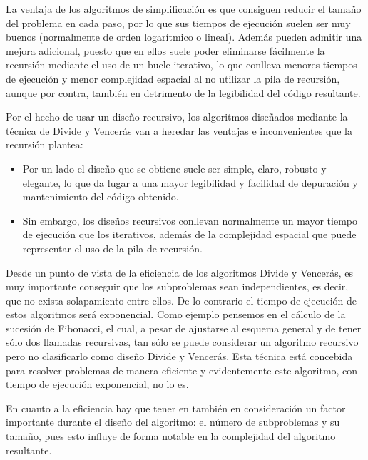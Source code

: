La ventaja de los algoritmos de simplificación es que consiguen reducir el
tamaño del problema en cada paso, por lo que sus tiempos de ejecución suelen ser
muy buenos (normalmente de orden logarítmico o lineal). Además pueden admitir
una mejora adicional, puesto que en ellos suele poder eliminarse fácilmente la
recursión mediante el uso de un bucle iterativo, lo que conlleva menores tiempos
de ejecución y menor complejidad espacial al no utilizar la pila de recursión,
aunque por contra, también en detrimento de la legibilidad del código resultante.

Por el hecho de usar un diseño recursivo, los algoritmos diseñados mediante la
técnica de Divide y Vencerás van a heredar las ventajas e inconvenientes que la
recursión plantea:

\begin{itemize}
	\item Por un lado el diseño que se obtiene suele ser simple, claro, robusto y elegante,
	lo que da lugar a una mayor legibilidad y facilidad de depuración y
	mantenimiento del código obtenido.
	
	\item Sin embargo, los diseños recursivos conllevan normalmente un mayor tiempo
	de ejecución que los iterativos, además de la complejidad espacial que puede
	representar el uso de la pila de recursión.
\end{itemize}

Desde un punto de vista de la eficiencia de los algoritmos Divide y Vencerás, es
muy importante conseguir que los subproblemas sean independientes, es decir, que
no exista solapamiento entre ellos. De lo contrario el tiempo de ejecución de estos
algoritmos será exponencial. Como ejemplo pensemos en el cálculo de la sucesión
de Fibonacci, el cual, a pesar de ajustarse al esquema general y de tener sólo dos
llamadas recursivas, tan sólo se puede considerar un algoritmo recursivo pero no
clasificarlo como diseño Divide y Vencerás. Esta técnica está concebida para
resolver problemas de manera eficiente y evidentemente este algoritmo, con tiempo
de ejecución exponencial, no lo es.

En cuanto a la eficiencia hay que tener en también en consideración un factor
importante durante el diseño del algoritmo: el número de subproblemas y su
tamaño, pues esto influye de forma notable en la complejidad del algoritmo
resultante.

